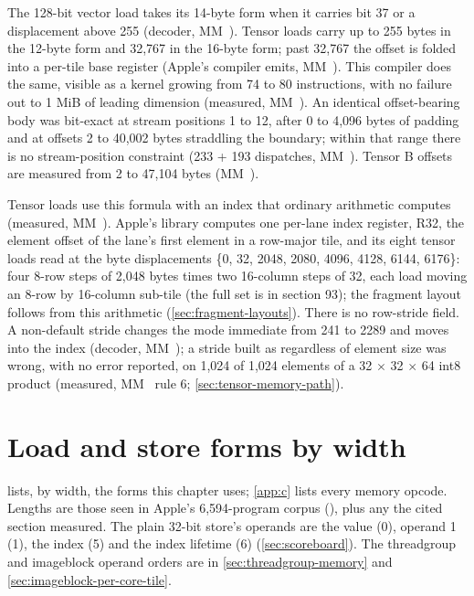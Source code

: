The 128-bit vector load takes its 14-byte form when it carries bit 37 or a
displacement above 255 (decoder, MM~). Tensor loads carry up to 255 bytes in the 12-byte form and 32,767 in the
16-byte form; past 32,767 the offset is folded into a per-tile base register (Apple's compiler emits, MM~).
This compiler does the same, visible as a kernel growing from 74 to 80 instructions, with no failure out to 1 MiB of
leading dimension (measured, MM~). An identical offset-bearing body was bit-exact at stream positions 1 to 12,
after 0 to 4,096 bytes of padding and at offsets 2 to 40,002 bytes straddling the boundary; within that range there is no
stream-position constraint (233 + 193 dispatches, MM~). Tensor B offsets are measured from 2 to 47,104
bytes (MM~).

Tensor loads use this formula with an index that ordinary arithmetic computes (measured, MM~). Apple's library computes one per-lane index register,
R32, the element offset of the lane's first element in a row-major tile, and its eight tensor loads read
\code{[R32*2 + disp]} at the byte displacements \{0, 32, 2048, 2080, 4096, 4128, 6144, 6176\}: four 8-row steps of 2,048
bytes times two 16-column steps of 32, each load moving an 8-row by 16-column sub-tile (the full set is in
 section 93); the fragment layout follows from this arithmetic (\cref{sec:fragment-layouts}). There is no row-stride
field. A non-default stride changes the mode immediate from 241 to 2289
and moves into the index (decoder, MM~); a stride built as  regardless of element size was wrong, with no
error reported, on 1,024 of 1,024 elements of a 32 $\times$ 32 $\times$ 64 int8 product (measured, MM~ rule 6; \cref{sec:tensor-memory-path}).

\section{Load and store forms by width}\label{sec:load-store-forms}

 lists, by width, the forms this chapter uses; \cref{app:c} lists every memory opcode. Lengths are those
seen in Apple's 6,594-program corpus (), plus any the cited section measured. The plain
32-bit store's operands are the value (0), operand 1 (1), the index (5) and the index lifetime (6) (\cref{sec:scoreboard}).
The threadgroup and imageblock operand orders are in \cref{sec:threadgroup-memory} and \cref{sec:imageblock-per-core-tile}.

